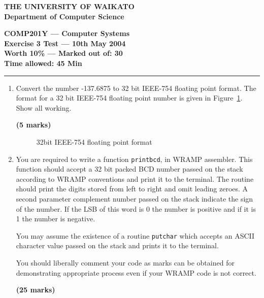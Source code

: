 \documentclass[a4paper,10pt]{article}
\begin{document}
\newcommand{\marks}[1]
{\begin{flushright}{\bf (#1 marks)}\end{flushright}}

{\centering \large \bf THE UNIVERSITY OF WAIKATO\\}
{\centering \large \bf Department of Computer Science\\[0.5cm]}

{\centering \large \bf COMP201Y ---  Computer Systems\\}
{\centering \large \bf Exercise 3 Test --- 10th May 2004\\[0.3cm]}
{\centering \bf Worth 10\% --- Marked out of: 30\\[0.3cm]}
{\centering \bf Time allowed: 45 Min\\[1cm]}
\hrule

\begin{enumerate}

\item Convert the number -137.6875 to 32 bit IEEE-754 floating point
format. The format for a 32 bit IEEE-754 floating point number is given
in Figure~\ref{fig:float}. Show all working.
\marks{5}

\begin{figure}[h]
  \begin{center}
    \caption{32bit IEEE-754 floating point format}
    \label{fig:float}
  \end{center}
\end{figure}


\item You are required to write a function \texttt{printbcd}, in WRAMP assembler. 
This function should accept a 32 bit packed BCD number passed on the stack according to WRAMP
conventions and print it to the terminal.  The routine should print the digits stored
from left to right and omit leading zeroes.  A second parameter complement number passed on the stack  indicate
the sign of the number.  If the LSB of this word is 0 the number is positive and if
it is 1 the number is negative.

You may assume the existence of a routine \texttt{putchar} which accepts an ASCII character value
passed on the stack and prints it to the terminal.

You should liberally comment your code as marks can be obtained for demonstrating appropriate
process even if your WRAMP code is not correct. 
%

\marks{25}

\end{enumerate}
\end{document}
